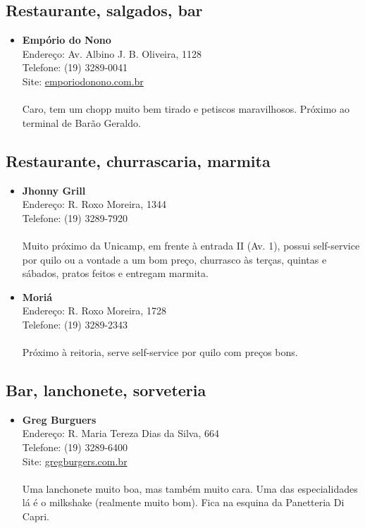 \subsection{Restaurante, salgados, bar}

\begin{itemize}
\item \textbf{Empório do Nono}
  \\Endereço: Av. Albino J. B. Oliveira, 1128
  \\Telefone: (19) 3289-0041
  \\Site: \url{emporiodonono.com.br}
  \\
  \\Caro, tem um chopp muito bem tirado e petiscos maravilhosos. Próximo ao
  terminal de Barão Geraldo.
\end{itemize}

\subsection{Restaurante, churrascaria, marmita}

\begin{itemize}
\item \textbf{Jhonny Grill}
  \\Endereço: R. Roxo Moreira, 1344
  \\Telefone: (19) 3289-7920
  \\
  \\Muito próximo da Unicamp, em frente à entrada II (Av. 1), possui
  self-service por quilo ou a vontade a um bom preço, churrasco às terças,
  quintas e sábados, pratos feitos e entregam marmita.

\item \textbf{Moriá}
  \\Endereço: R. Roxo Moreira, 1728
  \\Telefone: (19) 3289-2343
  \\
  \\Próximo à reitoria, serve self-service por quilo com preços bons.
\end{itemize}

\subsection{Bar, lanchonete, sorveteria}

\begin{itemize}
\item \textbf{Greg Burguers}
  \\Endereço: R. Maria Tereza Dias da Silva, 664
  \\Telefone: (19) 3289-6400
  \\Site: \url{gregburgers.com.br}
  \\
  \\Uma lanchonete muito boa, mas também muito cara. Uma das especialidades lá
  é o milkshake (realmente muito bom). Fica na esquina da Panetteria Di Capri.
\end{itemize}

